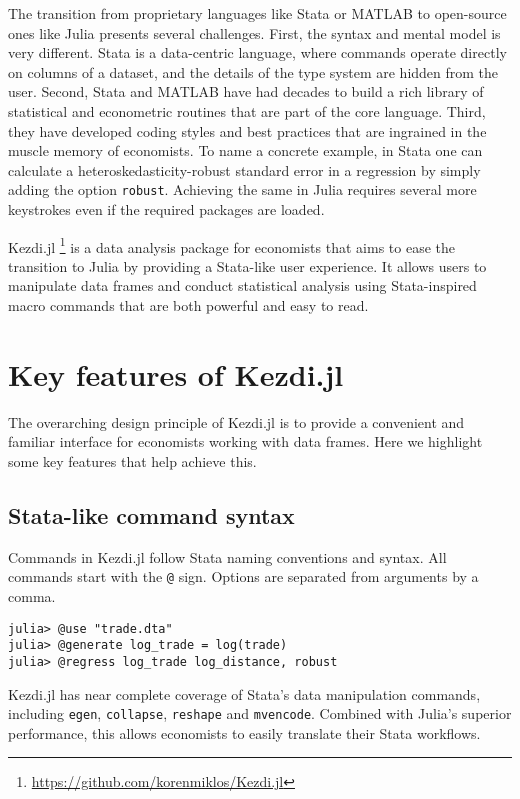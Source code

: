 \documentclass{juliacon}
\begin{document}
The transition from proprietary languages like Stata or MATLAB to open-source ones like Julia presents several challenges. First, the syntax and mental model is very different. Stata is a data-centric language, where commands operate directly on columns of a dataset, and the details of the type system are hidden from the user. Second, Stata and MATLAB have had decades to build a rich library of statistical and econometric routines that are part of the core language. Third, they have developed coding styles and best practices that are ingrained in the muscle memory of economists. To name a concrete example, in Stata one can calculate a heteroskedasticity-robust standard error in a regression by simply adding the option \texttt{robust}. Achieving the same in Julia requires several more keystrokes even if the required packages are loaded.

Kezdi.jl \footnote{\url{https://github.com/korenmiklos/Kezdi.jl}} is a data analysis package for economists that aims to ease the transition to Julia by providing a Stata-like user experience. It allows users to manipulate data frames and conduct statistical analysis using Stata-inspired macro commands that are both powerful and easy to read.

\section{Key features of Kezdi.jl}

The overarching design principle of Kezdi.jl is to provide a convenient and familiar interface for economists working with data frames. Here we highlight some key features that help achieve this.

\subsection{Stata-like command syntax}

Commands in Kezdi.jl follow Stata naming conventions and syntax. All commands start with the \texttt{@} sign. Options are separated from arguments by a comma.

\begin{verbatim}
julia> @use "trade.dta"
julia> @generate log_trade = log(trade)
julia> @regress log_trade log_distance, robust
\end{verbatim}

Kezdi.jl has near complete coverage of Stata's data manipulation commands, including \texttt{egen}, \texttt{collapse}, \texttt{reshape} and \texttt{mvencode}. Combined with Julia's superior performance, this allows economists to easily translate their Stata workflows.
\end{document}
